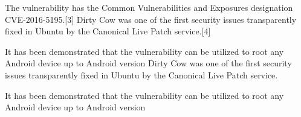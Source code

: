 \documentclass{article}
\begin{document}
\begin{itemize}
The vulnerability has the Common Vulnerabilities and Exposures designation CVE-2016-5195.[3] Dirty Cow was one of the first security issues transparently fixed in Ubuntu by the Canonical Live Patch service.[4]

It has been demonstrated that the vulnerability can be utilized to root any Android device up to Android version  Dirty Cow was one of the first security issues transparently fixed in Ubuntu by the Canonical Live Patch service.

It has been demonstrated that the vulnerability can be utilized to root any Android device up to Android version 


\end{itemize}
\end{document}
